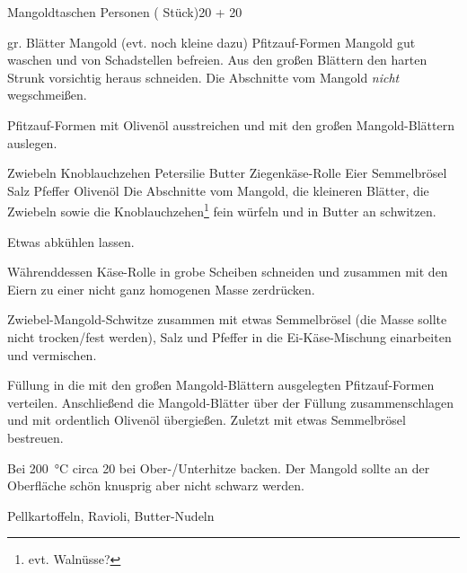 \begin{MyRecipe}{Mangoldtaschen}{ Personen ( Stück)}{\SI{20}{\minuteprime} + \SI{20}{\minuteprime}}
	
	\ingredient[\Calc{6}{\x}]{} {gr. Blätter Mangold (evt. noch kleine dazu)}
	\ingredient[\Calc{6}{\x}]{} {Pfitzauf-Formen}
	Mangold gut waschen und von Schadstellen befreien. Aus den großen Blättern den harten Strunk vorsichtig heraus schneiden. Die Abschnitte vom Mangold \emph{nicht} wegschmeißen.
	
	Pfitzauf-Formen mit Olivenöl ausstreichen und mit den großen Mangold-Blättern auslegen.\par\bigskip
	
	\ingredient[\Calc{1}{\x}]{} {Zwiebeln}
	\ingredient[\Calc{2}{\x}]{} {Knoblauchzehen}
	 {Petersilie}
	 {Butter}
	 {Ziegenkäse-Rolle}
	\ingredient[\Calc{1}{\x}]{} {Eier}
	\ingredient[\Calc{1}{\x}]{} {Semmelbrösel}
	 {Salz}
	 {Pfeffer}
	 {Olivenöl}
	Die Abschnitte vom Mangold, die kleineren Blätter, die Zwiebeln sowie die Knoblauchzehen\footnote{evt. Walnüsse?} fein würfeln und in Butter an schwitzen.

	Etwas abkühlen lassen.
	
	Währenddessen Käse-Rolle in grobe Scheiben schneiden und zusammen mit den Eiern zu einer nicht ganz homogenen Masse zerdrücken.
	
	Zwiebel-Mangold-Schwitze zusammen mit etwas Semmelbrösel (die Masse sollte nicht trocken/fest werden), Salz und Pfeffer in die Ei-Käse-Mischung einarbeiten und vermischen.

	Füllung in die mit den großen Mangold-Blättern ausgelegten Pfitzauf-Formen verteilen. Anschließend die Mangold-Blätter über der Füllung zusammenschlagen und mit ordentlich Olivenöl übergießen. Zuletzt mit etwas Semmelbrösel bestreuen.
	\par\bigskip

	Bei \SI{200}{\degreeCelsius} circa \SI{20}{\minuteprime} bei Ober-/Unterhitze backen. Der Mangold sollte an der Oberfläche schön knusprig aber nicht schwarz werden.
	\par\bigskip

	Pellkartoffeln, Ravioli, Butter-Nudeln
	

	
	
\end{MyRecipe}